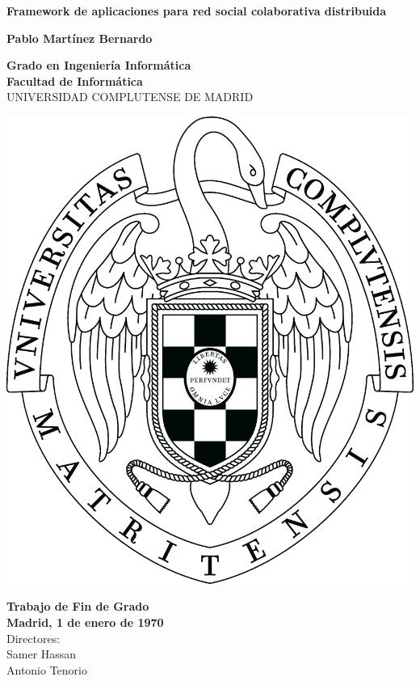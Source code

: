 \setcounter{page}{1}

\newpage
\thispagestyle{cover}
\begin{center}
  {\Huge \bf Framework de aplicaciones para red social colaborativa distribuida}

  \vfill
  {\LARGE\bf Pablo Martínez Bernardo}

  \vfill

  {\Large\bf Grado en Ingeniería Informática\\}
  {\Large\bf Facultad de Informática\\}
  \vspace*{0.4cm}
  {UNIVERSIDAD COMPLUTENSE DE MADRID}
  \vspace*{0.8cm}
  
   \begin{center}
   \includegraphics[keepaspectratio, scale=0.12]{ucmlogo.png}
   \end{center}
  
  \vspace*{0.5cm}

  {\large\bf Trabajo de Fin de Grado\\
             Madrid, 1 de enero de 1970\\}
  \vspace*{0.7cm}
  {\large Directores:\\
          Samer Hassan\\
          Antonio Tenorio}
  \vfill

  \rhead{}
  \rfoot{}
  \fancyhf{}

\end{center}

